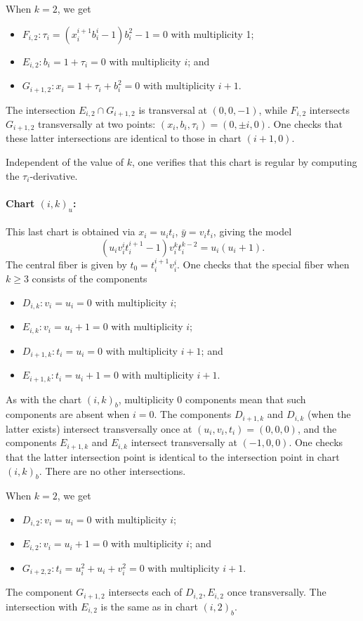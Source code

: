 \documentclass[reqno]{amsart}
\theoremstyle{definition}
\theoremstyle{remark}
\newcommand{\sy}{\bar{y}}
\begin{document}
When $k = 2$, we get
\begin{itemize}
    \item $F_{i,2}: \tau_i = (x_i^{i+1}b_i^i - 1) b_i^2 - 1 = 0$ with multiplicity 1;
    \item $E_{i,2}: b_i = 1+\tau_i = 0$ with multiplicity $i$; and
    \item $G_{i+1,2}: x_i = 1+\tau_i+b_i^2 = 0$ with multiplicity $i+1$.
\end{itemize}
The intersection $E_{i,2} \cap G_{i+1,2}$ is transversal at $(0,0,-1)$, while $F_{i,2}$ intersects $G_{i+1,2}$ transversally at two points: $(x_i, b_i, \tau_i) = (0, \pm i, 0)$. One checks that these latter intersections are identical to those in chart $(i+1,0)$.

Independent of the value of $k$, one verifies that this chart is regular by computing the $\tau_i$-derivative.

\paragraph{Chart $(i,k)_u$:}
\label{sec:chart-i-k_u}

This last chart is obtained via $x_i = u_it_i$, $\sy = v_it_i$, giving the model
\[
(u_iv_i^it_i^{i+1} - 1) v_i^k t_i^{k-2} = u_i(u_i + 1).
\]
The central fiber is given by $t_0 = t_i^{i+1}v_i^i$. One checks that the special fiber when $k \geq 3$ consists of the components
\begin{itemize}
    \item $D_{i,k}: v_i = u_i = 0$ with multiplicity $i$;
    \item $E_{i,k}: v_i = u_i + 1 = 0$ with multiplicity $i$;
    \item $D_{i+1,k}: t_i = u_i = 0$ with multiplicity $i+1$; and
    \item $E_{i+1,k}: t_i = u_i + 1 = 0$ with multiplicity $i+1$.
\end{itemize}
As with the chart $(i,k)_b$, multiplicity $0$ components mean that such components are absent when $i = 0$.
The components $D_{i+1,k}$ and $D_{i,k}$ (when the latter exists) intersect transversally once at $(u_i, v_i, t_i) = (0,0,0)$, and the components $E_{i+1,k}$ and $E_{i,k}$ intersect transversally at $(-1,0,0)$. One checks that the latter intersection point is identical to the intersection point in chart $(i,k)_b$. There are no other intersections.

When $k = 2$, we get
\begin{itemize}
    \item $D_{i,2}: v_i = u_i = 0$ with multiplicity $i$;
    \item $E_{i,2}: v_i = u_i + 1 = 0$ with multiplicity $i$; and
    \item $G_{i+2,2}: t_i = u_i^2 + u_i + v_i^2 = 0$ with multiplicity $i+1$.
\end{itemize}
The component $G_{i+1,2}$ intersects each of $D_{i,2}, E_{i,2}$ once transversally. The intersection with $E_{i,2}$ is the same as in chart $(i,2)_b$.
\end{document}

